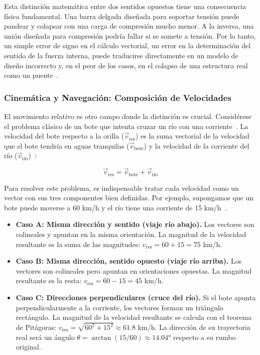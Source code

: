 \documentclass[12pt,a4paper]{article}
\begin{document}
Esta distinción matemática entre dos sentidos opuestos tiene una consecuencia física fundamental. Una barra delgada diseñada para soportar tensión puede pandear y colapsar con una carga de compresión mucho menor. A la inversa, una unión diseñada para compresión podría fallar si se somete a tensión. Por lo tanto, un simple error de signo en el cálculo vectorial, un error en la determinación del sentido de la fuerza interna, puede traducirse directamente en un modelo de diseño incorrecto y, en el peor de los casos, en el colapso de una estructura real como un puente~\cite{scribd_aplicaciones}.

\subsubsection{Cinemática y Navegación: Composición de Velocidades} \label{subsubsec:cinematica}

El movimiento relativo es otro campo donde la distinción es crucial. Considérese el problema clásico de un bote que intenta cruzar un río con una corriente~\cite{serway2008}. La velocidad del bote respecto a la orilla ($\vec{v}_{\text{res}}$) es la suma vectorial de la velocidad que el bote tendría en aguas tranquilas ($\vec{v}_{\text{bote}}$) y la velocidad de la corriente del río ($\vec{v}_{\text{río}}$)~\cite{serway2008}:

\begin{equation}
\vec{v}_{\text{res}} = \vec{v}_{\text{bote}} + \vec{v}_{\text{río}}
\end{equation}

Para resolver este problema, es indispensable tratar cada velocidad como un vector con sus tres componentes bien definidas. Por ejemplo, supongamos que un bote puede moverse a 60 km/h y el río tiene una corriente de 15 km/h~\cite{serway2008}.

\begin{itemize}
\item \textbf{Caso A: Misma dirección y sentido (viaje río abajo).} Los vectores son colineales y apuntan en la misma orientación. La magnitud de la velocidad resultante es la suma de las magnitudes: $v_{\text{res}} = 60 + 15 = 75$ km/h.

\item \textbf{Caso B: Misma dirección, sentido opuesto (viaje río arriba).} Los vectores son colineales pero apuntan en orientaciones opuestas. La magnitud resultante es la resta: $v_{\text{res}} = 60 - 15 = 45$ km/h.

\item \textbf{Caso C: Direcciones perpendiculares (cruce del río).} Si el bote apunta perpendicularmente a la corriente, los vectores forman un triángulo rectángulo. La magnitud de la velocidad resultante se calcula con el teorema de Pitágoras: $v_{\text{res}} = \sqrt{60^2 + 15^2} \approx 61.8$ km/h. La dirección de su trayectoria real será un ángulo $\theta = \arctan(15/60) \approx 14.04°$ respecto a su rumbo original.
\end{itemize}
\end{document}

